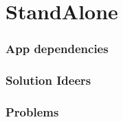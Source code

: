 \section{StandAlone}
\begin{frame}
	\frametitle{App dependencies}
	
\end{frame}
\begin{frame}
	\frametitle{Solution Ideers}

\end{frame}
\begin{frame}
	\frametitle{Problems}

\end{frame}
